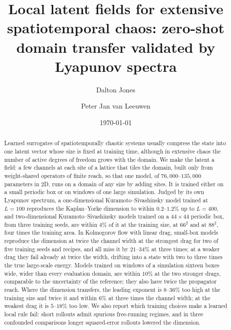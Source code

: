 \documentclass[aip,cha,reprint,amsmath,amssymb,nofootinbib,floatfix]{revtex4-2}
\begin{document}
\title{Local latent fields for extensive spatiotemporal chaos: zero-shot domain transfer
validated by Lyapunov spectra}

\author{Dalton Jones}
\author{Peter Jan van Leeuwen}

\date{\today}

\begin{abstract}
Learned surrogates of spatiotemporally chaotic systems usually compress the state into one latent
vector whose size is fixed at training time, although in extensive chaos the number of active
degrees of freedom grows with the domain. We make the latent a field: a few channels at each site of
a lattice that tiles the domain, built only from weight-shared operators of finite reach, so that one
model, of $76{,}000$--$135{,}000$ parameters in 2D, runs on a domain of any size by adding sites.
It is trained either on a small periodic box or on windows of one large simulation. Judged by its own Lyapunov spectrum, a one-dimensional Kuramoto--Sivashinsky model
trained at $L=100$ reproduces the Kaplan--Yorke dimension to within $0.2$--$1.2\%$ up to $L=400$, and
two-dimensional Kuramoto--Sivashinsky models trained on a $44\times44$ periodic box, from three
training seeds, are within $4\%$ of it at the training size, at $66^2$ and at $88^2$, four times
the training area.
In Kolmogorov flow with linear drag, small-box models reproduce the dimension at twice the channel
width at the strongest drag for two of five training seeds and recipes, and all miss it by
$21$--$34\%$ at three times; at a weaker drag they fail already at twice the width, drifting into a
state with two to three times the true large-scale energy. Models trained on windows of a
simulation sixteen boxes wide, wider than every evaluation domain, are within $10\%$ at the two
stronger drags, comparable to the uncertainty of the reference; they also have twice the
propagator reach. Where the dimension transfers, the leading exponent is $8$--$36\%$ too high at the
training size and twice it and within $6\%$ at three times the channel width; at the weakest drag
it is $5$--$18\%$ too low. We also report which training choices make a learned local rule fail:
short rollouts admit spurious free-running regimes, and in three confounded comparisons longer
squared-error rollouts lowered the dimension.
\end{abstract}

\maketitle
\end{document}
